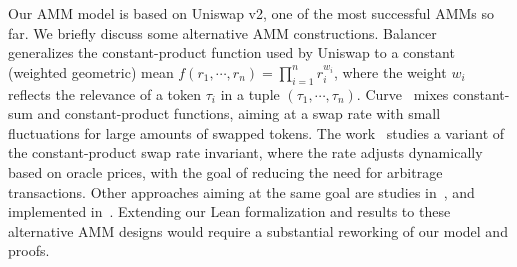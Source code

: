 Our AMM model is based on Uniswap v2, one of the most successful AMMs so far.
We briefly discuss some alternative AMM constructions.
%
Balancer~\cite{balancerpaper} generalizes the constant-product function
used by Uniswap to a constant (weighted geometric) mean
$f(r_1,\cdots,r_n) = \prod_{i=1}^n r_i^{w_i}$, 
where the weight $w_i$ reflects the relevance of a token $\tau_i$
in a tuple $(\tau_1,\cdots,\tau_n)$.
%
Curve~\cite{curvepaper} mixes constant-sum and constant-product functions,
aiming at a swap rate with small fluctuations for large amounts of swapped tokens. 
The work~\cite{Krishnamachari2021fab} studies a variant of the constant-product swap rate invariant, where the rate adjusts dynamically based on oracle prices, 
with the goal of reducing the need for arbitrage transactions.
%
Other approaches aiming at the same goal are studies in~\cite{virtualAMMbalances,Krishnamachari2021fab}, and implemented in~\cite{moonipaper}.
%
Extending our Lean formalization and results to these alternative AMM designs would require a substantial reworking of our model and proofs.


